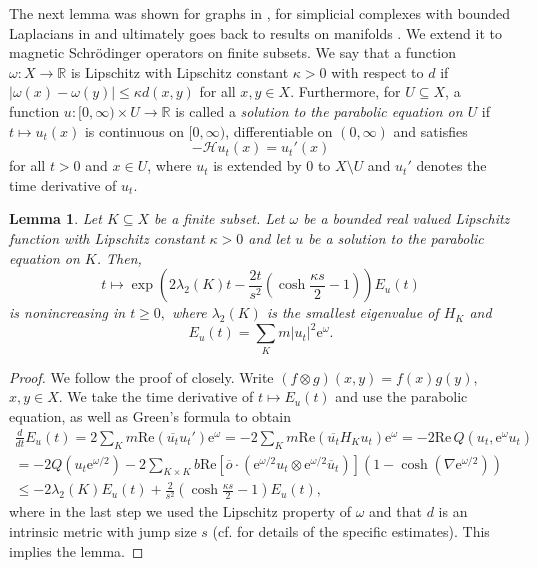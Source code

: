 \documentclass[10pt]{amsart}
\newtheorem{lemma}[theorem]{Lemma}
\theoremstyle{definition}
\begin{document}
The next lemma was shown for graphs in \cite{BHY1,BHY2}, for simplicial complexes with bounded Laplacians in \cite{HL} and ultimately goes back to results on manifolds \cite{Davies,Gaffney}. We extend it to magnetic Schrödinger operators on finite subsets. We say that a function $\omega:X\rightarrow\mathbb{R}$ is Lipschitz with Lipschitz constant $\kappa>0$ with respect to $d$ if 
$\vert \omega(x)-\omega(y)\vert\leq \kappa d(x,y)$ for all $x,y\in X$. Furthermore, for $U\subseteq X$, a function $u:[0,\infty)\times U\rightarrow\mathbb{R}$ is called a \emph{solution to the parabolic equation on $U$} if $t\mapsto u_t(x)$ is continuous on $[0,\infty)$, differentiable on $(0,\infty)$ and satisfies
\begin{equation*}%
    -\mathcal{H} u_t(x) = u_t'(x)
\end{equation*}
for all $t>0$ and $x\in U$, where $u_t$ is extended by $0$ to $X\setminus U$ and $u_t'$ denotes the time derivative of $u_t.$


\begin{lemma}\label{impfinite}
    Let $K\subseteq X$ be a finite subset. Let $ \omega$ be a bounded real valued Lipschitz function with Lipschitz constant $\kappa>0$ and  let $u$ be a solution to the parabolic equation on $K$. Then,
    \[t\mapsto \exp{\left(2\lambda_2(K)t-\frac{2t}{s^2}(\cosh{\frac{\kappa s}{2}}-1)\right)}E_u(t)\]
is nonincreasing  in $t\geq 0,$ where $\lambda_2(K)$ is the smallest eigenvalue of $H_K$ and \[E_u(t) = \sum_{ K}m|u_t|^2 \mathrm{e}^{\omega}.\]
\end{lemma}
\begin{proof}
We follow the proof of \cite[Lemma~3.2]{BHY2} closely. Write $(f\otimes g)(x,y)=f(x)g(y)$, $x,y\in X$.
We take the time derivative of $t\mapsto E_u(t)$ and use the parabolic equation, as well as  Green's formula to obtain
\begin{multline*}
 \frac{d}{dt}E_u(t)   = 2\sum_{K}m\mathrm{Re}( \overline{u_t} u_t' )\mathrm{e}^{\omega} = -2\sum_{K}m\mathrm{Re}( \overline{u_t}H_K u_t)\mathrm{e}^{\omega} 
 =-2 \mathrm{Re}\, Q(u_t,\mathrm{e}^\omega u_t)%
 \\ = -2Q(u_t \mathrm{e}^{{\omega}/{2}}) - 2 \sum_{K\times K}b \mathrm{Re}\left[\overline o\cdot(\mathrm{e}^{\omega\slash 2}u_t\otimes\mathrm{e}^{\omega\slash 2}\overline u_t )\right]\left(1-\cosh\left(\nabla \mathrm{e}^{\omega/2}\right)\right)\\
 \leq -2\lambda_2(K) E_u(t) + \frac{2}{s^2}(\cosh{\frac{\kappa s}{2}}-1)E_u(t),
\end{multline*}
where in the last step we used the Lipschitz property of $\omega$ and that $d$ is an intrinsic metric with jump size $s$ (cf. \cite[Lemma~3.2]{BHY2} for details of the specific estimates). This implies the lemma.
\end{proof}
\end{document}
